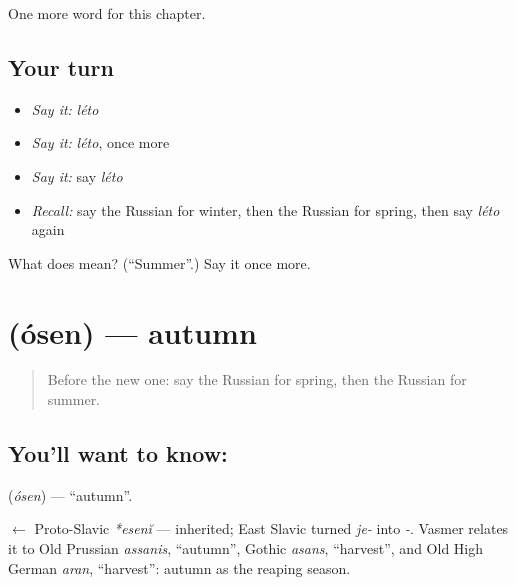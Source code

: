 \begin{grammarlens}[title={What you've built}]
One more word for this chapter.
\end{grammarlens}

\subsection*{Your turn}
\begin{itemize}
\raggedright
  \item \emph{Say it:} \emph{léto}
  \item \emph{Say it:} \emph{léto}, once more
  \item \emph{Say it:} say \emph{léto}
  \item \emph{Recall:} say the Russian for winter, then the Russian for spring, then say \emph{léto} again
\end{itemize}

\begin{tcolorbox}[breakable,colback=teal!4,colframe=teal!35!black,title={Before you move on}]
What does  mean? (\textquotedblleft{}Summer\textquotedblright{}.) Say it once more.
\end{tcolorbox}
\section[\texorpdfstring{\ru{осень} (ósen)}{осень (ósen)}]{ (ósen) — autumn}

\label{lesson:RU-C71-autumn}



\begin{quote}
Before the new one: say the Russian for spring, then the Russian for summer.
\end{quote}

\subsection*{You'll want to know: }
\textbf{} (\emph{ósen}) — \textquotedblleft{}autumn\textquotedblright{}.

\begin{cousinweb}
\textbf{} $\leftarrow$ Proto-Slavic \emph{*esenĭ} — inherited; East Slavic turned \emph{je-} into \emph{-}. Vasmer relates it to Old Prussian \emph{assanis}, \textquotedblleft{}autumn\textquotedblright{}, Gothic \emph{asans}, \textquotedblleft{}harvest\textquotedblright{}, and Old High German \emph{aran}, \textquotedblleft{}harvest\textquotedblright{}: autumn as the reaping season.
\end{cousinweb}

